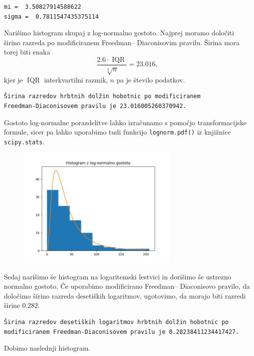 \documentclass[a4paper,12pt]{article}
\theoremstyle{definition}
\theoremstyle{plain}
\DeclareMathOperator*{\IQR}{IQR}
\begin{document}
\begin{verbatim}
mi =  3.50827914588622
sigma =  0.7811547435375114
\end{verbatim}

\noindent
Narišimo histogram skupaj z log-normalno gostoto. Najprej moramo določiti širino razreda po modificiranem Freedman–
Diaconisovim pravilu. Širina mora torej biti enaka $$\frac{2.6 \cdot \IQR}{\sqrt[3]n} = 23.016,$$ kjer je $\IQR$ interkvartilni razmik, $n$ pa je število podatkov. 

\begin{verbatim}
Širina razredov hrbtnih dolžin hobotnic po modificiranem 
Freedman-Diaconisovem pravilu je 23.016005260370942.
\end{verbatim}

\noindent
Gostoto log-normalne porazdelitve lahko izračunamo s pomočjo transformacijske formule, sicer pa lahko uporabimo tudi funkcijo \verb+lognorm.pdf()+ iz knjižnice \verb+scipy.stats+.

\begin{figure}[H]
    \centering
    \label{fig:hist1}
    \includegraphics[width=0.7\textwidth]{Histogram1.png}
\end{figure}

Sedaj narišimo še histogram na logaritemski lestvici in dorišimo še ustrezno normalno gostoto. Če uporabimo modificirano Freedman–
Diaconisovo pravilo, da določimo širino razreda desetiških logaritmov, ugotovimo, da morajo biti razredi širine $0.282$. 

\begin{verbatim}
Širina razredov desetiških logaritmov hrbtnih dolžin hobotnic po 
modificiranem Freedman-Diaconisovem pravilu je 0.28238411234417427.
\end{verbatim}

Dobimo naslednji histogram.
\end{document}

